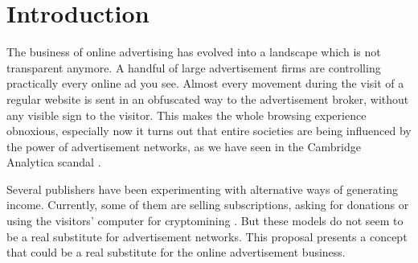 \chapter{Introduction}
\label{cha:introduction}

The business of online advertising has evolved into a landscape which is not transparent anymore. A handful of large advertisement firms are controlling practically every online ad you see. Almost every movement during the visit of a regular website is sent in an obfuscated way to the advertisement broker, without any visible sign to the visitor. This makes the whole browsing experience obnoxious, especially now it turns out that entire societies are being influenced by the power of advertisement networks, as we have seen in the Cambridge Analytica scandal \cite{FakeWebPage11}.

Several publishers have been experimenting with alternative ways of generating income. Currently, some of them are selling subscriptions, asking for donations or using the visitors' computer for cryptomining \cite{ruth2018digging}. But these models do not seem to be a real substitute for advertisement networks. This proposal presents a concept that could be a real substitute for the online advertisement business.

